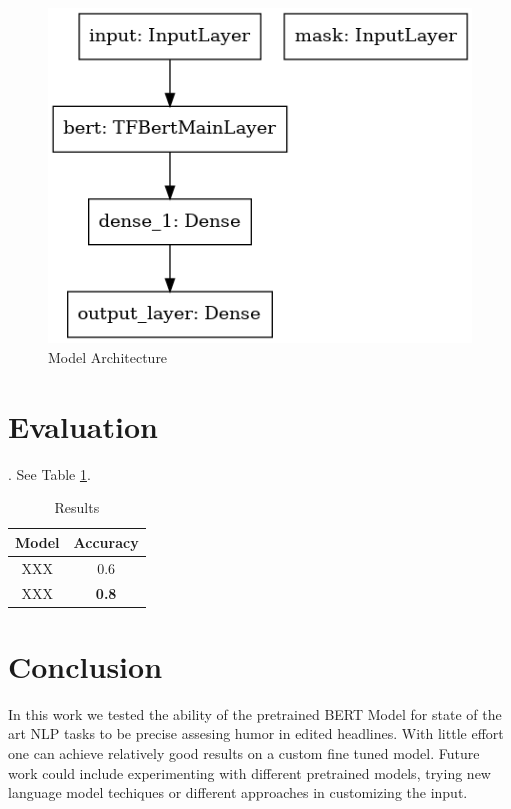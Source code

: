 \documentclass[11pt,a4paper,onecolumn,oneside,notitlepage]{article}
\begin{document}
	    \begin{figure}
		\begin{center}
			\includegraphics[width=1.0\linewidth]{model.png}
		\end{center}
		
		\caption{Model Architecture}\label{fig3}
	\end{figure}	
		
	\section{Evaluation}
     . See Table \ref{tab1}.
		
		\begin{table}
			\begin{center}
				\begin{tabular}{|c|c|}
					\hline
					\textbf{Model} &  \textbf{Accuracy}\\
					\hline
					\hline
					XXX & 0.6\\
					\hline
					XXX & \textbf{0.8}\\
					\hline
				\end{tabular}
			\end{center}
			
			\caption{Results}\label{tab1}
		\end{table}				
		

	\section{Conclusion}
	In this work we tested the ability of the pretrained BERT Model for state of the art NLP tasks to be precise assesing humor in edited headlines. With little effort one can achieve relatively good results on a custom fine tuned model. Future work could include experimenting with different pretrained models, trying new language model techiques or different approaches in customizing the input.
	
	\printbibliography
\end{document}
